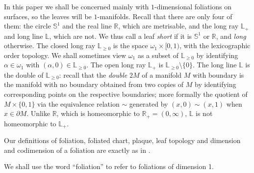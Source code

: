 \documentclass{amsart}
\newtheorem{defn}[theorem]{Definition}
\begin{document}
In this paper we shall be concerned mainly with $1$-dimensional foliations on surfaces, so the leaves will be $1$-manifolds. Recall that there are only four of them: the circle $\mathbb{S}^1$ and the real line ${\mathbb R}$, which are metrisable, and the long ray ${\mathbb{L}}_+$ and long line ${\mathbb{L}}$, which are not. We thus call a leaf {\em short} if it is $\mathbb{S}^1$ or ${\mathbb R}$, and {\em long} otherwise. The closed long ray ${\mathbb{L}}_{\ge 0}$ is the space $\omega_1\times[0,1)$, with the lexicographic order topology. We shall sometimes view $\omega_1$ as a subset of ${\mathbb{L}}_{\ge 0}$ by identifying $\alpha\in\omega_1$ with $(\alpha,0)\in {\mathbb{L}}_{\ge 0}$. The open long ray ${\mathbb{L}}_+$ is ${\mathbb{L}}_{\ge 0}\setminus\{0\}$. The long line ${\mathbb{L}}$ is the double of ${\mathbb{L}}_{\ge0}$: recall that the \emph{double} $2M$ of a manifold $M$ with boundary is the manifold with no boundary obtained from two copies of $M$ by identifying corresponding points on the respective boundaries; more formally the quotient of $M\times\{0,1\}$ via the equivalence relation $\sim$ generated by $(x,0)\sim(x,1)$ when $x\in\partial M$. Unlike ${\mathbb R}$, which is homeomorphic to ${\mathbb R}_+=(0,\infty)$, ${\mathbb{L}}$ is not homeomorphic to ${\mathbb{L}}_+$.

Our definitions of foliation, foliated chart, plaque, leaf topology and dimension and codimension of a foliation are exactly as in \cite[Definition 1.1]{BGG1}.
\iffalse 
\begin{defn}
  A \emph{foliation} $\mathcal{F}$ on a $n$-manifold $M$ is a maximal atlas $\{(U_i,\varphi_i)\,:i\in I\}$ on $M$ such that for each $i,j\in I$ the coordinate transformations $\varphi_j\varphi_i^{-1}:\varphi_i(U_i\cap U_j)\to \varphi_j(U_i\cap U_j)$ are of the form
  $$
    \varphi_j\varphi_i^{-1}(x,y)=\Bigl( g_{i,j}(x,y),h_{i,j}(y)\Bigr)
  $$
for all $(x,y)\in{\mathbb R}^p\times{\mathbb R}^{n-p}$, where $g_{i,j}:\varphi_i(U_i\cap U_j)\to{\mathbb R}^p$, and $h_{i,j}$ is an embedding from a relevant open subset of ${\mathbb R}^{n-p}$ to ${\mathbb R}^{n-p}$. Such a chart is called a \emph{foliated chart}. Components of sets of the form $\varphi_i^{-1}({\mathbb R}^p\times\{y\})$ are called \emph{plaques}. The latter constitute the basis for a new topology on $M$ (known as the \emph{leaf topology}) whose path components are injectively immersed $p$-manifolds called the \emph{leaves} of $\mathcal{F}$. The number $p$ is the dimension of $\mathcal{F}$ while $n-p$ is the codimension.
\end{defn}
\fi
We shall use the word ``foliation'' to refer to foliations of dimension 1.
\end{document}
